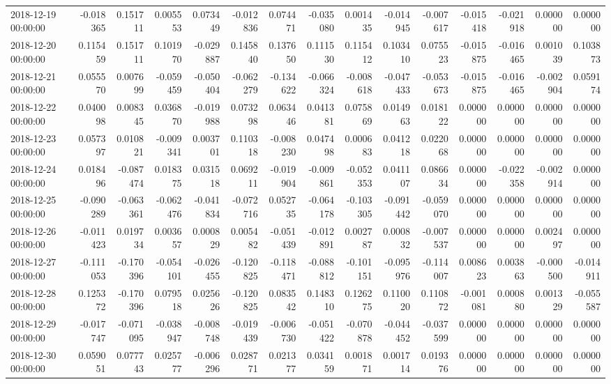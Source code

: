 \begin{tabular}{lrrrrrrrrrrrrrr}
2018-12-19 00:00:00 & -0.018365 & 0.151711 & 0.005553 & 0.073449 & -0.012836 & 0.074471 & -0.035080 & 0.001435 & -0.014945 & -0.007617 & -0.015418 & -0.021918 & 0.000000 & 0.000000 \\
2018-12-20 00:00:00 & 0.115459 & 0.151711 & 0.101970 & -0.029887 & 0.145840 & 0.137650 & 0.111530 & 0.115412 & 0.103410 & 0.075523 & -0.015875 & -0.016465 & 0.001039 & 0.103873 \\
2018-12-21 00:00:00 & 0.055570 & 0.007699 & -0.059459 & -0.050404 & -0.062279 & -0.134622 & -0.066324 & -0.008618 & -0.047433 & -0.053673 & -0.015875 & -0.016465 & -0.002904 & 0.059174 \\
2018-12-22 00:00:00 & 0.040098 & 0.008345 & 0.036870 & -0.019988 & 0.073298 & 0.063446 & 0.041381 & 0.075869 & 0.014963 & 0.018122 & 0.000000 & 0.000000 & 0.000000 & 0.000000 \\
2018-12-23 00:00:00 & 0.057397 & 0.010821 & -0.009341 & 0.003701 & 0.110318 & -0.008230 & 0.047498 & 0.000683 & 0.041218 & 0.022068 & 0.000000 & 0.000000 & 0.000000 & 0.000000 \\
2018-12-24 00:00:00 & 0.018496 & -0.087474 & 0.018375 & 0.031518 & 0.069211 & -0.019904 & -0.009861 & -0.052353 & 0.041107 & 0.086634 & 0.000000 & -0.022358 & -0.002914 & 0.000000 \\
2018-12-25 00:00:00 & -0.090289 & -0.063361 & -0.062476 & -0.041834 & -0.072716 & 0.052735 & -0.064178 & -0.103305 & -0.091442 & -0.059070 & 0.000000 & 0.000000 & 0.000000 & 0.000000 \\
2018-12-26 00:00:00 & -0.011423 & 0.019734 & 0.003657 & 0.000829 & 0.005482 & -0.051439 & -0.012891 & 0.002787 & 0.000832 & -0.007537 & 0.000000 & 0.000000 & 0.002497 & 0.000000 \\
2018-12-27 00:00:00 & -0.111053 & -0.170396 & -0.054101 & -0.026455 & -0.120825 & -0.118471 & -0.088812 & -0.101151 & -0.095976 & -0.114007 & 0.008623 & 0.003863 & -0.000500 & -0.014911 \\
2018-12-28 00:00:00 & 0.125372 & -0.170396 & 0.079518 & 0.025626 & -0.120825 & 0.083542 & 0.148310 & 0.126275 & 0.110020 & 0.110872 & -0.001081 & 0.000880 & 0.001329 & -0.055587 \\
2018-12-29 00:00:00 & -0.017747 & -0.071095 & -0.038947 & -0.008748 & -0.019439 & -0.006730 & -0.051422 & -0.070878 & -0.044452 & -0.037599 & 0.000000 & 0.000000 & 0.000000 & 0.000000 \\
2018-12-30 00:00:00 & 0.059051 & 0.077743 & 0.025777 & -0.006296 & 0.028771 & 0.021377 & 0.034159 & 0.001871 & 0.001714 & 0.019376 & 0.000000 & 0.000000 & 0.000000 & 0.000000 \\

\end{tabular}

